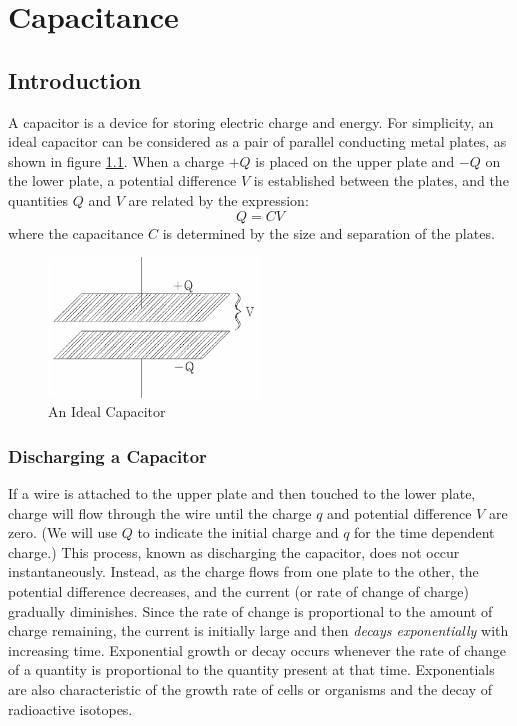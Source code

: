 \chapter{Capacitance}

\section{Introduction}

A capacitor is a device for storing electric charge and energy. For simplicity, an ideal capacitor can be considered as a pair of parallel conducting metal plates, as shown in figure \ref{fig:capacitor}. When a charge $+Q$ is placed on the upper plate and $-Q$ on the lower plate, a potential difference $V$ is established between the plates, and the quantities $Q$ and $V$ are related by the expression:
\begin{equation}
    Q = CV
\end{equation}
where the capacitance $C$ is determined by the size and separation of the plates.

\begin{figure}[h]
    \begin{center}
        \includegraphics[width=0.5\textwidth]{./Exp4/pic/image1.png}
    \end{center}
    \caption{An Ideal Capacitor}
    \label{fig:capacitor}
\end{figure}

\subsection{Discharging a Capacitor}

If a wire is attached to the upper plate and then touched to the lower plate, charge will flow through the wire until the charge $q$ and potential difference $V$ are zero. (We will use $Q$ to indicate the initial charge and $q$ for the time dependent charge.) This process, known as discharging the capacitor, does not occur instantaneously. Instead, as the charge flows from one plate to the other, the potential difference decreases, and the current (or rate of change of charge) gradually diminishes. Since the rate of change is proportional to the amount of charge remaining, the current is initially large and then \emph{decays exponentially} with increasing time. Exponential growth or decay occurs whenever the rate of change of a quantity is proportional to the quantity present at that time. Exponentials are also characteristic of the growth rate of cells or organisms and the decay of radioactive isotopes.

